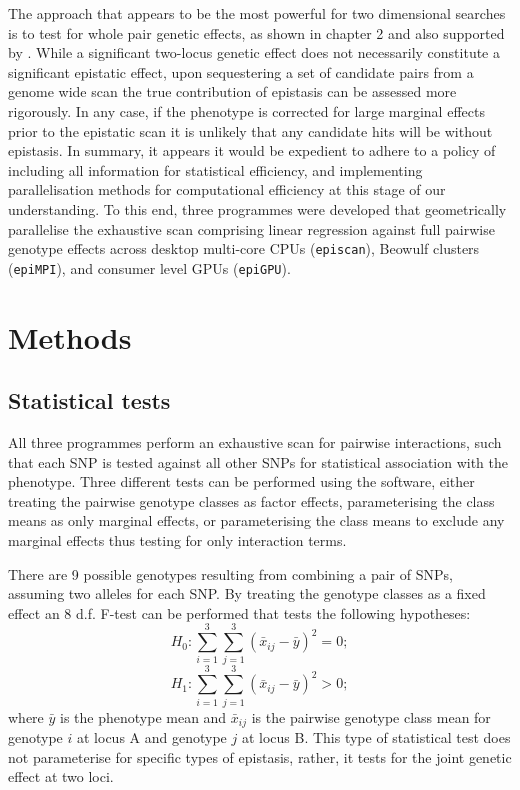 The approach that appears to be the most powerful for two dimensional searches is to test for whole pair genetic effects, as shown in chapter 2 and also supported by \cite{Marchini2005}. While a significant two-locus genetic effect does not necessarily constitute a significant epistatic effect, upon sequestering a set of candidate pairs from a genome wide scan the true contribution of epistasis can be assessed more rigorously. In any case, if the phenotype is corrected for large marginal effects prior to the epistatic scan it is unlikely that any candidate hits will be without epistasis. In summary, it appears it would be expedient to adhere to a policy of including all information for statistical efficiency, and implementing parallelisation methods for computational efficiency at this stage of our understanding. To this end, three programmes were developed that geometrically parallelise the exhaustive scan comprising linear regression against full pairwise genotype effects across desktop multi-core CPUs ({\tt episcan}), Beowulf clusters ({\tt epiMPI}), and consumer level GPUs ({\tt epiGPU}).


\section{Methods}

\subsection{Statistical tests}

All three programmes perform an exhaustive scan for pairwise interactions, such that each SNP is tested against all other SNPs for statistical association with the phenotype. Three different tests can be performed using the software, either treating the pairwise genotype classes as factor effects, parameterising the class means as only marginal effects, or parameterising the class means to exclude any marginal effects thus testing for only interaction terms.

There are 9 possible genotypes resulting from combining a pair of SNPs, assuming two alleles for each SNP. By treating the genotype classes as a fixed effect an 8 d.f. F-test can be performed that tests the following hypotheses:
\begin{equation}
H_{0}: \sum_{i=1}^{3}\sum_{j=1}^{3} (\bar{x}_{ij} - \bar{y})^{2} = 0; \label{eq:nullfull}
\end{equation}
\begin{equation}
H_{1}: \sum_{i=1}^{3}\sum_{j=1}^{3} (\bar{x}_{ij} - \bar{y})^{2} > 0; \label{eq:altfull}
\end{equation} where $\bar{y}$ is the phenotype mean and $\bar{x}_{ij}$ is the pairwise genotype class mean for genotype $i$ at locus A and genotype $j$ at locus B. This type of statistical test does not parameterise for specific types of epistasis, rather, it tests for the joint genetic effect at two loci.

